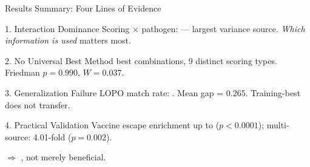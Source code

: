 \begin{frame}{Results Summary: Four Lines of Evidence}
  \small
  \begin{block}{1. Interaction Dominance}
    Scoring $\times$ pathogen:  --- largest variance source. \textit{Which information is used} matters most.
  \end{block}
  \begin{block}{2. No Universal Best Method}
     best combinations, 9 distinct scoring types. Friedman $p = 0.990$, $W = 0.037$.
  \end{block}
  \begin{block}{3. Generalization Failure}
    LOPO match rate: . Mean gap = 0.265. Training-best does not transfer.
  \end{block}
  \begin{block}{4. Practical Validation}
    Vaccine escape enrichment up to  ($p < 0.0001$); multi-source: 4.01-fold ($p = 0.002$).
  \end{block}
  \vspace{0.3em}
  \centering
  $\Rightarrow$ , not merely beneficial.
\end{frame}
